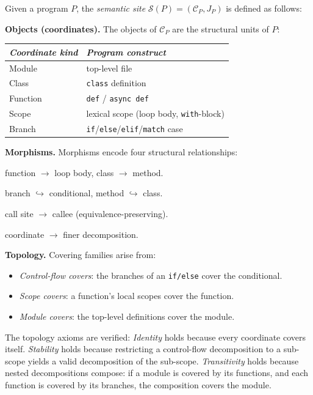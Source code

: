 \begin{example}
\label{ex:site:programs}
Given a program $P$, the \emph{semantic site}
$\mathcal{S}(P) = (\mathcal{C}_P, J_P)$ is defined as follows:

\medskip\noindent\textbf{Objects (coordinates).}  The objects of
$\mathcal{C}_P$ are the structural units of $P$:
\begin{center}
\begin{tabular}{ll}
\emph{Coordinate kind} & \emph{Program construct} \\
\hline
Module   & top-level file \\
Class    & \texttt{class} definition \\
Function & \texttt{def} / \texttt{async def} \\
Scope    & lexical scope (loop body, \texttt{with}-block) \\
Branch   & \texttt{if}/\texttt{else}/\texttt{elif}/\texttt{match} case
\end{tabular}
\end{center}

\medskip\noindent\textbf{Morphisms.}  Morphisms encode four
structural relationships:
\begin{description}[nosep,leftmargin=2em]
\item[Restriction:] function $\to$ loop body, class $\to$ method.
\item[Inclusion:] branch $\hookrightarrow$ conditional, method $\hookrightarrow$ class.
\item[Transport:] call site $\to$ callee (equivalence-preserving).
\item[Refinement:] coordinate $\to$ finer decomposition.
\end{description}

\medskip\noindent\textbf{Topology.}  Covering families arise from:
\begin{itemize}[nosep]
\item \emph{Control-flow covers}: the branches of an \texttt{if/else}
  cover the conditional.
\item \emph{Scope covers}: a function's local scopes cover the function.
\item \emph{Module covers}: the top-level definitions cover the module.
\end{itemize}

The topology axioms are verified:
\emph{Identity} holds because every coordinate covers itself.
\emph{Stability} holds because restricting a control-flow decomposition
to a sub-scope yields a valid decomposition of the sub-scope.
\emph{Transitivity} holds because nested decompositions compose: if a
module is covered by its functions, and each function is covered by its
branches, the composition covers the module.
\end{example}

